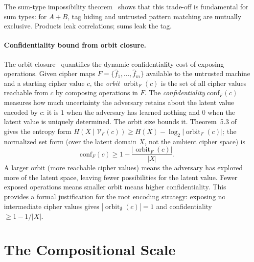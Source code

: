 \documentclass[conference]{IEEEtran}
\theoremstyle{definition}
\theoremstyle{plain}
\theoremstyle{remark}
\newcommand{\fhat}{\hat{f}}
\DeclareMathOperator{\orbitF}{orbit}
\begin{document}
The sum-type impossibility theorem~\cite[Thm.~4.2]{towell2026algebraic}
shows that this trade-off is fundamental for sum types: for
$A + B$, tag hiding and untrusted pattern matching are mutually
exclusive.  Products leak correlations; sums leak the tag.

\paragraph{Confidentiality bound from orbit closure.}
The orbit closure~\cite[Sec.~5]{towell2026algebraic} quantifies the
dynamic confidentiality cost of exposing operations.  Given cipher maps
$F = \{\fhat_1, \ldots, \fhat_m\}$ available to the untrusted machine
and a starting cipher value $c$, the \emph{orbit}
$\orbitF_F(c)$ is the set of all cipher values reachable from $c$ by
composing operations in $F$.  The \emph{confidentiality}
$\mathrm{conf}_F(c)$ measures how much uncertainty the adversary retains
about the latent value encoded by $c$: it is $1$ when the adversary has
learned nothing and $0$ when the latent value is uniquely determined.
The orbit size bounds it.  Theorem~5.3
of~\cite{towell2026algebraic} gives the entropy form
$H(X \mid \mathcal{V}_F(c)) \geq H(X) - \log_2|\orbitF_F(c)|$; the
normalized set form (over the latent domain $X$, not the ambient
cipher space) is
\begin{equation}
\mathrm{conf}_F(c) \geq 1 - \frac{|\orbitF_F(c)|}{|X|}.
\end{equation}
A larger orbit (more reachable cipher values) means the adversary has
explored more of the latent space, leaving fewer possibilities for the
latent value.  Fewer exposed operations means smaller orbit means higher
confidentiality.  This provides a formal justification for the root
encoding strategy: exposing no intermediate cipher values gives
$|\orbitF_\emptyset(c)| = 1$ and confidentiality $\geq 1 - 1/|X|$.


\section{The Compositional Scale}
\label{sec:composition}
\end{document}

